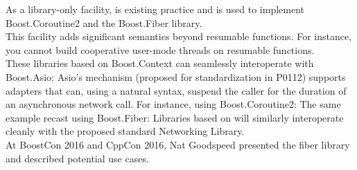 \label{appendixa}
As a library-only facility,
\cite{bcontext} is existing practice
and is used to implement Boost.Coroutine2\cite{bcoroutine2} and the
Boost.Fiber library\cite{bfiber}.\\
\newline
This facility adds significant semantics beyond resumable functions. For
instance, you cannot build cooperative user-mode threads on resumable
functions.\\
\newline
These libraries based on Boost.Context can seamlessly interoperate with
Boost.Asio\cite{basio}: Asio's  mechanism (proposed for
standardization in P0112\cite{P0112}) supports adapters that can, using a
natural syntax, suspend the caller for the duration of an asynchronous network
call. For instance, using Boost.Coroutine2:
The same example recast using Boost.Fiber:
Libraries based on \ectx will similarly interoperate cleanly with the proposed
standard Networking Library\cite{P0112}.\\
\newline
At BoostCon 2016\cite{boostcon} and CppCon 2016\cite{cppcon}, Nat Goodspeed
presented the fiber library and described potential use cases.
